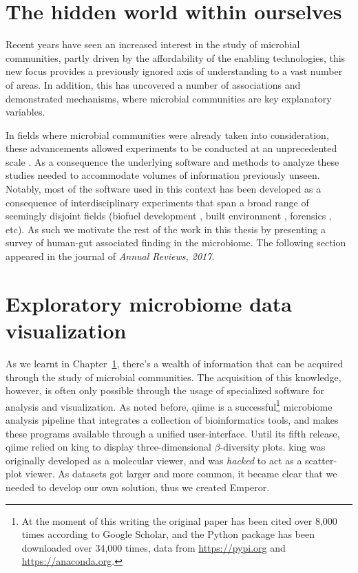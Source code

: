 \documentclass[12pt,chapterheads]{ucsd}
\begin{document}
%




\chapter{The hidden world within ourselves}\label{chapter_review}

Recent years have seen an increased interest in the study of microbial
communities, partly driven by the affordability of the enabling technologies,
this new focus provides a previously ignored axis of understanding to a vast
number of areas. In addition, this has uncovered a number of associations and
demonstrated mechanisms, where microbial communities are key explanatory
variables.

In fields where microbial communities were already taken into consideration,
these advancements allowed experiments to be conducted at an unprecedented 
scale \cite{RN35, RN4061, RN4267}. As a consequence the underlying software and 
methods to analyze these studies needed to accommodate volumes of information
previously unseen. Notably, most of the software used in this context has been
developed as a consequence of interdisciplinary experiments that span a broad
range of seemingly disjoint fields (biofuel development \cite{RN4268}, built 
environment \cite{RN4270, RN4083}, forensics \cite{RN4269, RN4271}, etc).  As 
such we motivate the rest of the work in this thesis by presenting a survey of 
human-gut associated finding in the microbiome.  The following section 
appeared in the journal of \textsl{Annual Reviews, 2017}.



\chapter{Exploratory microbiome data visualization}\label{exploratory_chapter}

As we learnt in Chapter~\ref{chapter_review}, there's a wealth of information 
that can be acquired through the study of microbial communities. The 
acquisition of this knowledge, however, is often only possible through the 
usage of specialized software for analysis and visualization. As noted before, 
\gls{qiime} is a successful\footnote{At the moment of this writing the original 
paper has been cited over 8,000 times according to Google Scholar, and the 
Python package has been downloaded over 34,000 times, data from 
\url{https://pypi.org} and \url{https://anaconda.org}.} microbiome analysis 
pipeline that integrates a collection of bioinformatics tools, and makes these 
programs available through a unified user-interface. Until its fifth release, 
\gls{qiime} relied on \gls{king} to display three-dimensional $\beta$-diversity 
plots. \gls{king} was originally developed as a molecular viewer, and was 
\textit{hacked} to act as a scatter-plot viewer. As datasets got larger and 
more common, it became clear that we needed to develop our own solution, thus 
we created Emperor.
\end{document}
